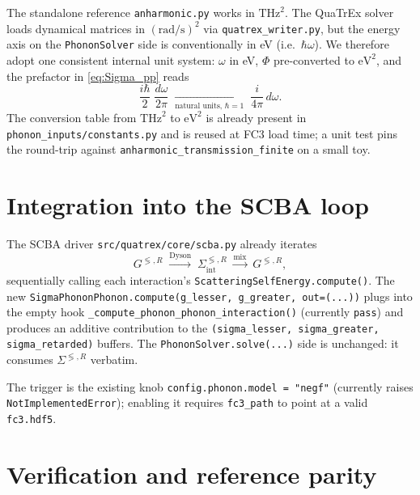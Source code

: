 The standalone reference \texttt{anharmonic.py} works in
$\mathrm{THz}^{2}$. The QuaTrEx solver loads dynamical matrices in
$(\mathrm{rad}/\mathrm{s})^{2}$ via
\texttt{quatrex\_writer.py}, but the energy axis on the
\texttt{PhononSolver} side is conventionally in eV (i.e.\
$\hbar\omega$). We therefore adopt one consistent
internal unit system: $\omega$ in eV, $\Phi$ pre-converted to
$\mathrm{eV}^{2}$, and the prefactor in
\eqref{eq:Sigma_pp} reads
\begin{equation}\label{eq:phph_prefactor}
  \frac{i\hbar}{2}\;\frac{d\omega}{2\pi}
  \;\xrightarrow[\text{natural units, }\hbar=1]{}\;
  \frac{i}{4\pi}\,d\omega.
\end{equation}
The conversion table from $\mathrm{THz}^{2}$ to $\mathrm{eV}^{2}$ is
already present in \texttt{phonon\_inputs/constants.py} and is reused at
FC3 load time; a unit test pins the round-trip against
\texttt{anharmonic\_transmission\_finite} on a small toy.

\section{Integration into the SCBA loop}
\label{sec:phph_scba}

The SCBA driver \texttt{src/quatrex/core/scba.py} already iterates
\begin{equation*}
  G^{\lessgtr,R}\;\xrightarrow{\text{Dyson}}\;
  \Sigma^{\lessgtr,R}_{\text{int}}\;\xrightarrow{\text{mix}}\;G^{\lessgtr,R},
\end{equation*}
sequentially calling each interaction's
\texttt{ScatteringSelfEnergy.compute()}. The new
\texttt{SigmaPhononPhonon.compute(g\_lesser, g\_greater, out=(...))}
plugs into the empty hook
\texttt{\_compute\_phonon\_phonon\_interaction()} (currently
\texttt{pass}) and produces an additive contribution to the
\texttt{(sigma\_lesser, sigma\_greater, sigma\_retarded)} buffers. The
\texttt{PhononSolver.solve(...)} side is unchanged: it consumes
$\Sigma^{\lessgtr,R}$ verbatim.

The trigger is the existing knob
\texttt{config.phonon.model = "negf"} (currently raises
\texttt{NotImplementedError}); enabling it requires \texttt{fc3\_path} to
point at a valid \texttt{fc3.hdf5}.

\section{Verification and reference parity}
\label{sec:phph_reference}

